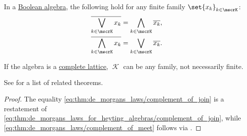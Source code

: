 \begin{theorem}\label{thm:de_morgans_laws}
  In a \hyperref[def:boolean_algebra]{Boolean algebra}, the following hold for any finite family \( \set{ x_k }_{k \in \mscrK} \):
  \begin{align}
    \oline{\bigvee_{k \in \mscrK} x_k}   &= \bigwedge_{k \in \mscrK} \oline{x_k}, \label{eq:thm:de_morgans_laws/complement_of_join} \\
    \oline{\bigwedge_{k \in \mscrK} x_k} &= \bigvee_{k \in \mscrK} \oline{x_k}.   \label{eq:thm:de_morgans_laws/complement_of_meet}
  \end{align}

  If the algebra is a \hyperref[def:complete_lattice]{complete lattice}, \( \mscrK \) can be any family, not necessarily finite.
\end{theorem}
\begin{comments}
  \item See  for a list of related theorems.
\end{comments}
\begin{proof}
  The equality \eqref{eq:thm:de_morgans_laws/complement_of_join} is a restatement of \eqref{eq:thm:de_morgans_laws_for_heyting_algebras/complement_of_join}, while \eqref{eq:thm:de_morgans_laws/complement_of_meet} follows via .
\end{proof}

